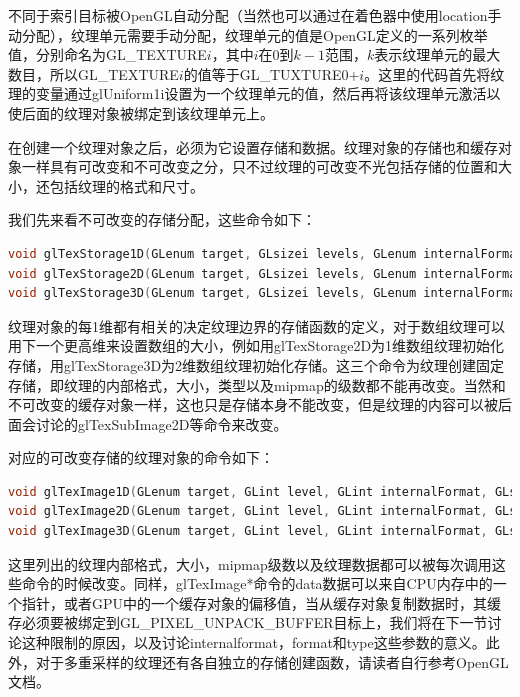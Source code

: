 不同于索引目标被OpenGL自动分配（当然也可以通过在着色器中使用location手动分配），纹理单元需要手动分配，纹理单元的值是OpenGL定义的一系列枚举值，分别命名为GL\_TEXTURE$i$，其中$i$在0到$k-1$范围，$k$表示纹理单元的最大数目，所以GL\_TEXTURE$i$的值等于GL\_TUXTURE0+$i$。这里的代码首先将纹理的变量通过glUniform1i设置为一个纹理单元的值，然后再将该纹理单元激活以使后面的纹理对象被绑定到该纹理单元上。

在创建一个纹理对象之后，必须为它设置存储和数据。纹理对象的存储也和缓存对象一样具有可改变和不可改变之分，只不过纹理的可改变不光包括存储的位置和大小，还包括纹理的格式和尺寸。

我们先来看不可改变的存储分配，这些命令如下：

\begin{lstlisting}[language=C++]
void glTexStorage1D(GLenum target, GLsizei levels, GLenum internalFormat, GLsizei width);
void glTexStorage2D(GLenum target, GLsizei levels, GLenum internalFormat, GLsizei width, GLsizei height);
void glTexStorage3D(GLenum target, GLsizei levels, GLenum internalFormat, GLsizei width, GLsizei height, GLsizei depth);
\end{lstlisting}

纹理对象的每1维都有相关的决定纹理边界的存储函数的定义，对于数组纹理可以用下一个更高维来设置数组的大小，例如用glTexStorage2D为1维数组纹理初始化存储，用glTexStorage3D为2维数组纹理初始化存储。这三个命令为纹理创建固定存储，即纹理的内部格式，大小，类型以及mipmap的级数都不能再改变。当然和不可改变的缓存对象一样，这也只是存储本身不能改变，但是纹理的内容可以被后面会讨论的glTexSubImage2D等命令来改变。

对应的可改变存储的纹理对象的命令如下：

\begin{lstlisting}[language=C++]
void glTexImage1D(GLenum target, GLint level, GLint internalFormat, GLsizei width, GLint border, GLenum format, GLenum type, const void *data);
void glTexImage2D(GLenum target, GLint level, GLint internalFormat, GLsizei width, GLsizei height, GLint border, GLenum format, GLenum type, const void *data);
void glTexImage3D(GLenum target, GLint level, GLint internalFormat, GLsizei width,GLsizei height, GLsizei depth, GLint border, GLenum format, GLenum type, const void *data);
\end{lstlisting}

这里列出的纹理内部格式，大小，mipmap级数以及纹理数据都可以被每次调用这些命令的时候改变。同样，glTexImage*命令的data数据可以来自CPU内存中的一个指针，或者GPU中的一个缓存对象的偏移值，当从缓存对象复制数据时，其缓存必须要被绑定到GL\_PIXEL\_UNPACK\_BUFFER目标上，我们将在下一节讨论这种限制的原因，以及讨论internalformat，format和type这些参数的意义。此外，对于多重采样的纹理还有各自独立的存储创建函数，请读者自行参考OpenGL文档\cite{b:OpenGL4.5CoreProfile}。





